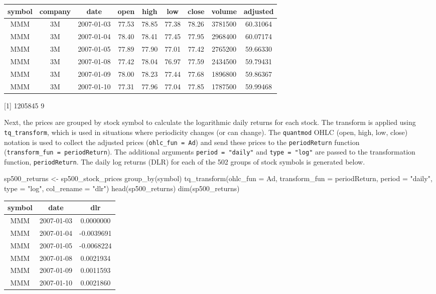 \begin{tabular}{ccccccccc}
\toprule
symbol & company & date & open & high & low & close & volume & adjusted\\
\midrule
MMM & 3M & 2007-01-03 & 77.53 & 78.85 & 77.38 & 78.26 & 3781500 & 60.31064\\
MMM & 3M & 2007-01-04 & 78.40 & 78.41 & 77.45 & 77.95 & 2968400 & 60.07174\\
MMM & 3M & 2007-01-05 & 77.89 & 77.90 & 77.01 & 77.42 & 2765200 & 59.66330\\
MMM & 3M & 2007-01-08 & 77.42 & 78.04 & 76.97 & 77.59 & 2434500 & 59.79431\\
MMM & 3M & 2007-01-09 & 78.00 & 78.23 & 77.44 & 77.68 & 1896800 & 59.86367\\
MMM & 3M & 2007-01-10 & 77.31 & 77.96 & 77.04 & 77.85 & 1787500 & 59.99468\\
\bottomrule
\end{tabular}

{[}1{]} 1205845 9

\hspace{20 mm}

Next, the prices are grouped by stock symbol to calculate the
logarithmic daily returns for each stock. The transform is applied using
\texttt{tq\_transform}, which is used in situations where periodicity
changes (or can change). The \texttt{quantmod} OHLC (open, high, low,
close) notation is used to collect the adjusted prices
(\texttt{ohlc\_fun\ =\ Ad}) and send these prices to the
\texttt{periodReturn} function
(\texttt{transform\_fun\ =\ periodReturn}). The additional arguments
\texttt{period\ =\ "daily"} and \texttt{type\ =\ "log"} are passed to
the transformation function, \texttt{periodReturn}. The daily log
returns (DLR) for each of the 502 groups of stock symbols is generated
below.

\begin{Schunk}
\begin{Sinput}
sp500_returns <- sp500_stock_prices %
    group_by(symbol) %
    tq_transform(ohlc_fun = Ad, transform_fun = periodReturn, 
                 period = "daily", type = "log", col_rename = "dlr")
head(sp500_returns)
dim(sp500_returns)
\end{Sinput}
\end{Schunk}

\begin{tabular}{ccc}
\toprule
symbol & date & dlr\\
\midrule
MMM & 2007-01-03 & 0.0000000\\
MMM & 2007-01-04 & -0.0039691\\
MMM & 2007-01-05 & -0.0068224\\
MMM & 2007-01-08 & 0.0021934\\
MMM & 2007-01-09 & 0.0011593\\
MMM & 2007-01-10 & 0.0021860\\
\bottomrule
\end{tabular}

